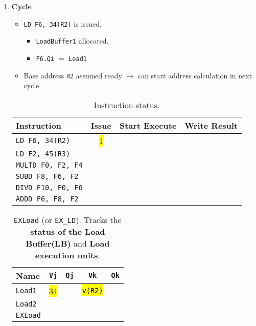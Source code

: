 \begin{enumerate}
    \item \textbf{Cycle \theenumi}
    \begin{itemize}
        \item \texttt{LD F6, 34(R2)} is issued.
        \begin{itemize}
            \item \texttt{LoadBuffer1} allocated.
            \item \texttt{F6.Qi} $=$ \texttt{Load1}
        \end{itemize}
        \item Base address \texttt{R2} assumed ready $\rightarrow$ can start address calculation in next cycle.
    \end{itemize}

    \begin{table}[!htp]
        \centering
        \begin{tabular}{@{} l | c c c @{}}
            \toprule
            Instruction                 & Issue & Start Execute & Write Result  \\
            \midrule
            \texttt{LD    F6, 34(R2)}   & \hl{1}&               &               \\ [.3em]
            \texttt{LD    F2, 45(R3)}   &       &               &               \\ [.3em]
            \texttt{MULTD F0, F2, F4}   &       &               &               \\ [.3em]
            \texttt{SUBD  F8, F6, F2}   &       &               &               \\ [.3em]
            \texttt{DIVD  F10, F0, F6}  &       &               &               \\ [.3em]
            \texttt{ADDD  F6, F8, F2}   &       &               &               \\
            \bottomrule
        \end{tabular}
        \caption*{Instruction status.}
    \end{table}

    \begin{table}[!htp]
        \centering
        \begin{tabular}{@{} l | c c c c @{}}
            \toprule
            Name            & \texttt{Vj}   & \texttt{Qj}   & \texttt{Vk}           & \texttt{Qk}   \\
            \midrule
            \texttt{Load1}  & \hl{34}       &               & \hl{\texttt{v(R2)}}   &               \\ [.3em]
            \texttt{Load2}  &               &               &                       &               \\
            \cmidrule{1-5}
            \texttt{EXLoad} &               &               &                       &               \\
            \bottomrule
        \end{tabular}
        \caption*{\texttt{EXLoad} (or \texttt{EX\_LD}). Tracks the \textbf{status of the Load Buffer(LB)} and \textbf{Load execution units}.}
    \end{table}


\end{enumerate}
